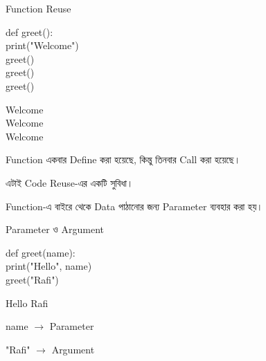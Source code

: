 \begin{codeoutputbox}{Function Reuse}

\noindent
\begin{minipage}[t]{0.53\linewidth}
\codeheading

\begin{english}
\ttfamily
def greet():\\
\hspace*{4mm}print("Welcome")\\[0.5mm]
greet()\\
greet()\\
greet()
\end{english}

\end{minipage}
\hfill
\begin{minipage}[t]{0.43\linewidth}
\outputheading

\begin{english}
\ttfamily
Welcome\\
Welcome\\
Welcome
\end{english}

\medskip

Function একবার Define করা হয়েছে,
কিন্তু তিনবার Call করা হয়েছে।

এটাই Code Reuse-এর একটি সুবিধা।

\end{minipage}

\end{codeoutputbox}



Function-এ বাইরে থেকে Data পাঠানোর জন্য Parameter ব্যবহার করা হয়।

\begin{codeoutputbox}{Parameter ও Argument}

\noindent
\begin{minipage}[t]{0.53\linewidth}
\codeheading

\begin{english}
\ttfamily
def greet(name):\\
\hspace*{4mm}print("Hello", name)\\[0.5mm]
greet("Rafi")
\end{english}

\end{minipage}
\hfill
\begin{minipage}[t]{0.43\linewidth}
\outputheading

\begin{center}
\textenglish{\ttfamily Hello Rafi}
\end{center}

\textenglish{\ttfamily name}
\(\longrightarrow\)
Parameter

\medskip

\textenglish{\ttfamily "Rafi"}
\(\longrightarrow\)
Argument

\end{minipage}

\end{codeoutputbox}

